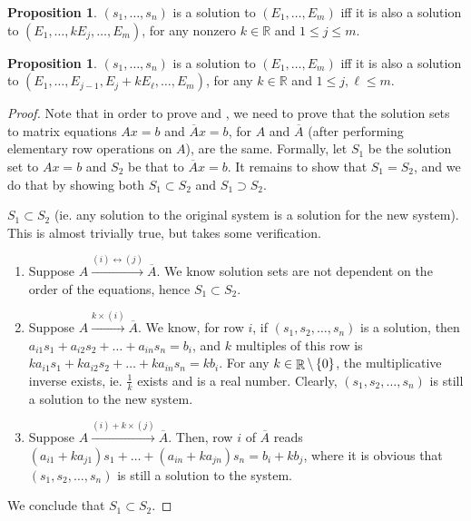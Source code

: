 \documentclass{amsart}
\theoremstyle{definition}
\newtheorem{proposition}[definition]{Proposition}
\theoremstyle{definition}
\DeclareMathOperator{\R}{\mathbb{R}}
\DeclareMathOperator{\1}{\mathbbm{1}}
\renewcommand{\leq}{\leqslant}
\begin{document}
\begin{enumerate}[itemsep = 2mm]
	
	\begin{proposition}
		\label{prop1}
		$(s_1,\ldots, s_n)$ is a solution to $(E_1,\dots,E_m)$ iff it is also a solution to $(E_1,\dots,k E_j,\dots,E_m)$, for any nonzero $k\in \mathbb{R}$ and $1 \leq j \leq m$.
	\end{proposition}
	
	\begin{proposition}
		\label{prop2}
		$(s_1,\ldots, s_n)$ is a solution to $(E_1,\dots,E_m)$ iff it is also a solution to $(E_1, \dots, E_{j-1}, E_j + k E_\ell, \dots, E_m)$, for any $k\in \mathbb{R}$ and $1 \leq j,\ell \leq m$.
	\end{proposition}
	
	
	\begin{proof}
		Note that in order to prove  and , we need to prove that the solution sets to matrix equations $Ax = b$ and $\overline{A} x = b$, for $A$ and $\overline{A}$ (after performing elementary row operations on $A$), are the same. Formally, let $S_1$ be the solution set to $Ax = b$ and $S_2$ be that to $\overline{A} x = b$. It remains to show that $S_1 = S_2$, and we do that by showing both $S_1 \subset S_2$ and $S_1 \supset S_2$.
		
		\uline{$S_1 \subset S_2$} (ie. any solution to the original system is a solution for the new system). This is almost trivially true, but takes some verification.
		\begin{enumerate}
			\item Suppose $A \xrightarrow{(i) \leftrightarrow (j)} \overline{A}$. We know solution sets are not dependent on the order of the equations, hence $S_1 \subset S_2$.
			
			\item Suppose $A \xrightarrow{k \times (i)} \overline{A}$. We know, for row $i$, if $(s_1,s_2,\dots,s_n)$ is a solution, then $a_{i1} s_1 + a_{i2} s_2 + \dots + a_{in} s_n = b_i$, and $k$ multiples of this row is $k a_{i1} s_1 + k a_{i2} s_2 + \dots + k a_{in} s_n = k b_i$. For any $k \in \R \setminus \set{0}$, the multiplicative inverse exists, ie. $\frac{1}{k}$ exists and is a real number. Clearly, $(s_1,s_2,\dots,s_n)$ is still a solution to the new system. 
			
			\item Suppose $A \xrightarrow{(i) + k \times (j)} \overline{A}$. Then, row $i$ of $\overline{A}$ reads $(a_{i1} + k a_{j1}) s_1 + \dots + (a_{in} + k a_{jn}) s_n = b_i + k b_j$, where it is obvious that $(s_1,s_2,\dots,s_n)$ is still a solution to the system.
		\end{enumerate}
		We conclude that $S_1 \subset S_2$.
		

\end{proof}
\end{enumerate}
\end{document}
